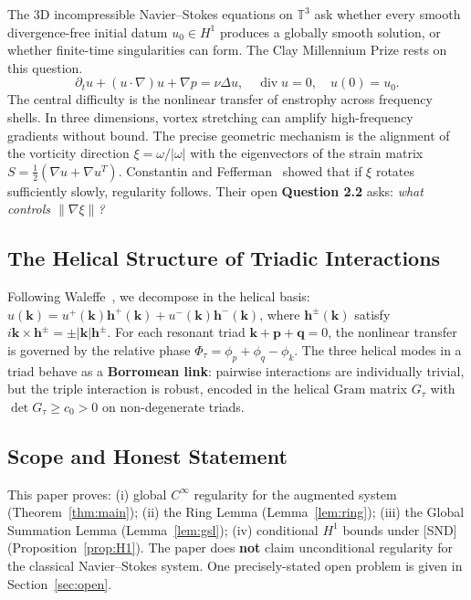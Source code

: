 \documentclass[11pt]{article}
\begin{document}
The 3D incompressible Navier--Stokes equations on $\mathbb{T}^3$ ask whether every smooth
divergence-free initial datum $u_0 \in H^1$ produces a globally smooth solution, or whether
finite-time singularities can form. The Clay Millennium Prize rests on this question.
\[
\partial_t u + (u\cdot\nabla)u + \nabla p = \nu\Delta u,\quad \operatorname{div} u = 0,\quad u(0)=u_0.
\]
The central difficulty is the nonlinear transfer of enstrophy across frequency shells. In three
dimensions, vortex stretching can amplify high-frequency gradients without bound. The precise
geometric mechanism is the alignment of the vorticity direction $\xi = \omega/|\omega|$ with the
eigenvectors of the strain matrix $S = \tfrac{1}{2}(\nabla u + \nabla u^T)$. Constantin and
Fefferman~\cite{CF1993} showed that if $\xi$ rotates sufficiently slowly, regularity follows.
Their open \textbf{Question 2.2} asks: \textit{what controls $\|\nabla\xi\|$?}

\subsection{The Helical Structure of Triadic Interactions}

Following Waleffe~\cite{Waleffe1992}, we decompose in the helical basis:
$\hat{u}(\mathbf{k}) = u^+(\mathbf{k})\mathbf{h}^+(\mathbf{k}) + u^-(\mathbf{k})\mathbf{h}^-(\mathbf{k})$,
where $\mathbf{h}^\pm(\mathbf{k})$ satisfy $i\mathbf{k}\times\mathbf{h}^\pm = \pm|\mathbf{k}|\mathbf{h}^\pm$.
For each resonant triad $\mathbf{k}+\mathbf{p}+\mathbf{q}=0$, the nonlinear transfer is governed
by the relative phase $\Phi_\tau = \phi_p + \phi_q - \phi_k$. The three helical modes in a triad
behave as a \textbf{Borromean link}: pairwise interactions are individually trivial, but the triple
interaction is robust, encoded in the helical Gram matrix $G_\tau$ with
$\det G_\tau \geq c_0 > 0$ on non-degenerate triads.

\subsection{Scope and Honest Statement}

This paper proves: (i) global $C^\infty$ regularity for the augmented system (Theorem~\ref{thm:main}); (ii) the Ring Lemma (Lemma~\ref{lem:ring}); (iii) the Global Summation Lemma (Lemma~\ref{lem:gsl}); (iv) conditional $H^1$ bounds under [SND] (Proposition~\ref{prop:H1}). The paper does \textbf{not} claim unconditional regularity for the classical Navier--Stokes system. One precisely-stated open problem is given in Section~\ref{sec:open}.
\end{document}
